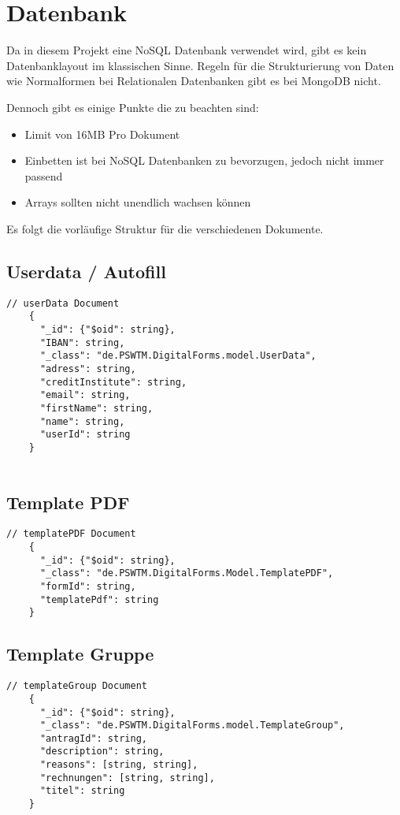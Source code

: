 \chapter{Datenbank}
Da in diesem Projekt eine NoSQL Datenbank verwendet wird, gibt es kein Datenbanklayout im klassischen Sinne.
Regeln für die Strukturierung von Daten wie Normalformen bei Relationalen Datenbanken gibt es bei MongoDB nicht.

Dennoch gibt es einige Punkte die zu beachten sind:
\begin{itemize}
    \item Limit von 16\ac{MB} Pro Dokument
    \item Einbetten ist bei NoSQL Datenbanken zu bevorzugen, jedoch nicht immer passend
    \item Arrays sollten nicht unendlich wachsen können
\end{itemize}

Es folgt die vorläufige Struktur für die verschiedenen Dokumente.

\section{Userdata / Autofill}

\begin{lstlisting}[label={lst:lstlistingusers}]
    // userData Document
    {
      "_id": {"$oid": string},
      "IBAN": string,
      "_class": "de.PSWTM.DigitalForms.model.UserData",
      "adress": string,
      "creditInstitute": string,
      "email": string,
      "firstName": string,
      "name": string,
      "userId": string
    }


\end{lstlisting}

\section{Template PDF}
\begin{lstlisting}[label={lst:lstlistingauto}]
    // templatePDF Document
    {
      "_id": {"$oid": string},
      "_class": "de.PSWTM.DigitalForms.Model.TemplatePDF",
      "formId": string,
      "templatePdf": string
    }

\end{lstlisting}

\section{Template Gruppe}
\begin{lstlisting}[label={lst:templateGroup}]
    // templateGroup Document
    {
      "_id": {"$oid": string},
      "_class": "de.PSWTM.DigitalForms.model.TemplateGroup",
      "antragId": string,
      "description": string,
      "reasons": [string, string],
      "rechnungen": [string, string],
      "titel": string
    }

\end{lstlisting}


